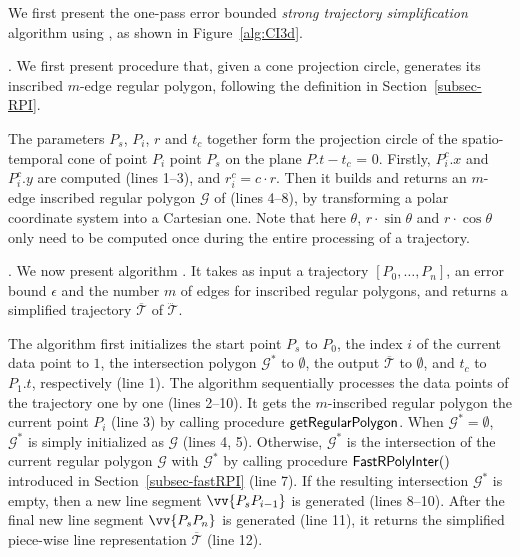  We first present the  one-pass error bounded {\em strong trajectory simplification} algorithm using \sed, as shown in Figure~\ref{alg:CI3d}.

.
We first present procedure  that, given a cone projection circle, generates its inscribed $m$-edge regular polygon,  following the definition in Section~\ref{subsec-RPI}.

The parameters $P_s$, $P_i$, $r$ and $t_c$ together form the projection circle  of the spatio-temporal cone  of point $P_{i}$ \wrt point $P_s$ on the plane $P.t - t_c$ = $0$. Firstly, $P^c_i.x$ and $P^c_i.y$ are computed (lines 1--3), and $r^c_i = c\cdot r$.
Then it builds and returns an $m$-edge inscribed regular polygon $\mathcal{G}$ of  (lines 4--8), by transforming a polar coordinate system
into a Cartesian one. Note that here $\theta$, $r\cdot\sin\theta$ and $r\cdot\cos\theta$ only need to be computed once during the entire processing of a trajectory.

. We now present algorithm \cist. It takes as input a trajectory ${[P_0, \ldots, P_n]}$, an error bound $\epsilon$ and the number $m$ of edges for inscribed regular polygons, and returns a simplified  trajectory $\overline{\mathcal{T}}$ of $\dddot{\mathcal{T}}$.



The algorithm first initializes the start point $P_s$ to $P_0$, the index $i$ of the current data point to $1$, the intersection polygon $\mathcal{G}^*$ to $\emptyset$, the output $\overline{\mathcal{T}}$ to $\emptyset$, and $t_c$ to $P_1.t$, respectively (line 1).
%
The algorithm sequentially processes the data points of the trajectory one by one  (lines 2--10). It gets the $m$-inscribed regular polygon \wrt the current point $P_i$ (line 3) by calling procedure ${\mathsf{getRegularPolygon}}$. When $\mathcal{G}^* = \emptyset$, $\mathcal{G}^*$ is simply initialized as $\mathcal{G}$ (lines 4, 5). Otherwise,
$\mathcal{G}^*$ is  the intersection of the current regular polygon $\mathcal{G}$ with $\mathcal{G}^*$ by calling procedure ${\mathsf{FastRPolyInter}}()$ introduced in Section~\ref{subsec-fastRPI} (line 7). If the resulting intersection $\mathcal{G}^*$ is empty, then a new line segment $\vv{P_sP_{i-1}}$ is generated (lines 8--10).
After the  final new line segment $\vv{P_sP_{n}}$ is generated (line 11), it returns the simplified  piece-wise line representation $\overline{\mathcal{T}}$ (line 12).





